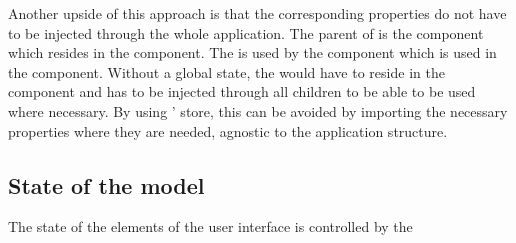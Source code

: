 Another upside of this approach is that the corresponding properties do not have to be injected through the whole application.
The parent of  is the  component which resides in the  component.
The  is used by the  component which is used in the  component.
Without a global state, the  would have to reside in the  component and has to be injected through all children to be able to be used where necessary.
By using ' store, this can be avoided by importing the necessary properties where they are needed, agnostic to the application structure.

\subsection{State of the  model}\label{ch:state_mec2_model}

The state of the elements of the user interface is controlled by the 
